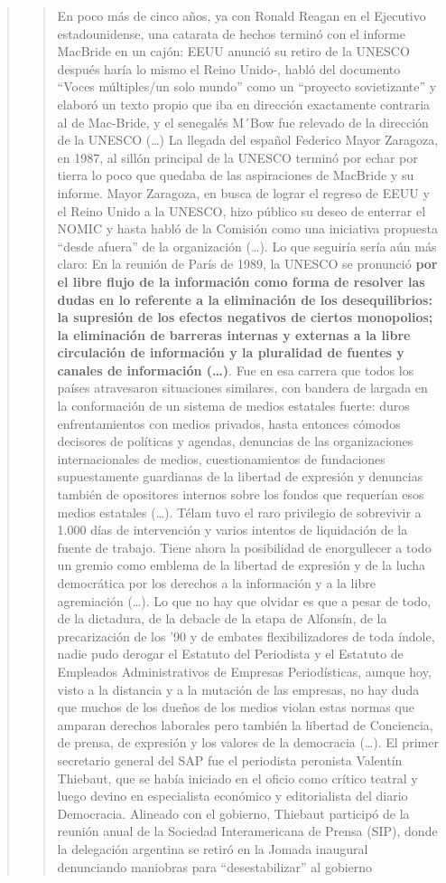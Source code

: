 \begin{quote}
\begin{quote}
	En poco más de cinco años, ya con Ronald Reagan en el Ejecutivo estadounidense, una catarata de hechos terminó con el informe MacBride en un cajón: EEUU anunció su retiro de la UNESCO después haría lo mismo el Reino Unido-, habló del documento \enquote{Voces múltiples/un solo mundo} como un \enquote{proyecto sovietizante} y elaboró un texto propio que iba en dirección exactamente contraria al de Mac-Bride, y el senegalés M´Bow  fue relevado de la dirección de la UNESCO (\dots) La llegada del español Federico Mayor Zaragoza, en 1987, al sillón principal de la UNESCO terminó por echar por tierra lo poco que quedaba de las aspiraciones de MacBride y su informe. Mayor Zaragoza, en busca de lograr el regreso de EEUU y el Reino Unido a la UNESCO, hizo público su deseo de enterrar el NOMIC y hasta habló de la Comisión como una iniciativa propuesta \enquote{desde afuera} de la organización (\dots). Lo que seguiría sería aún más claro: En la reunión de París de 1989, la UNESCO se pronunció \textbf{por el libre flujo de la información como forma de resolver las dudas en lo referente a la eliminación de los desequilibrios: la supresión de los efectos negativos de ciertos monopolios; la eliminación de barreras internas y externas a la libre circulación de información y la pluralidad de fuentes y canales de información (\dots)}. Fue en esa carrera que todos los países atravesaron situaciones similares, con bandera de largada en la conformación de un sistema de medios estatales fuerte: duros enfrentamientos con medios privados, hasta entonces cómodos decisores de políticas y agendas, denuncias de las organizaciones internacionales de medios, cuestionamientos de fundaciones supuestamente guardianas de la libertad de expresión y denuncias también de opositores internos sobre los fondos que requerían esos medios estatales (\dots). Télam tuvo el raro privilegio de sobrevivir a 1.000 días de intervención y varios intentos de liquidación de la fuente de trabajo. Tiene ahora la posibilidad de enorgullecer a todo un gremio como emblema de la libertad de expresión y de la lucha democrática por los derechos a la información y a la libre agremiación (\dots). Lo que no hay que olvidar es que a pesar de todo, de la dictadura, de la debacle de la etapa de Alfonsín, de la precarización de los '90 y de embates flexibilizadores de toda índole, nadie pudo derogar el Estatuto del Periodista y el Estatuto de Empleados Administrativos de Empresas Periodísticas, aunque hoy, visto a la distancia y a la mutación de las empresas, no hay duda que muchos de los dueños de los medios violan estas normas que amparan derechos laborales pero también la libertad de Conciencia, de prensa, de expresión y los valores de la democracia (\dots). El primer secretario general del SAP fue el periodista peronista Valentín Thiebaut, que se había iniciado en el oficio como crítico teatral y luego devino en especialista económico y editorialista del diario Democracia. Alineado con el gobierno, Thiebaut participó de la reunión anual de la Sociedad Interamericana de Prensa (SIP), donde la delegación argentina se retiró en la Jomada inaugural denunciando maniobras para \enquote{desestabilizar} al gobierno 
\end{quote}
\end{quote}
